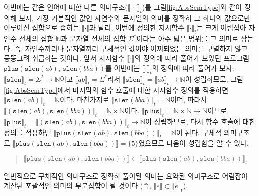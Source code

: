 이번에는 같은 언어에 때한 다른 의미구조($\llbracket\,\cdot\,\rrbracket_t$)를
그림\;\ref{fig:AbsSemType}와 같이 정의해 보자. 가장 기본적인 값인 자연수와
문자열의 의미를 정확히 그 하나의 값으로만 이루어진 집합으로 좁히는
$\llbracket\cdot\rrbracket$과 달리, 이번에 정의한 지시함수
$\llbracket\cdot\rrbracket_t$는 크게 어림잡아 자연수 전체의 집합 $\mathbb{N}$과
문자열 전체의 집합 $\Sigma^{*}$이라는 아주 넓은 범위를 그 의미로 삼는다.
즉, 자연수끼리나 문자열끼리 구체적인 값이야 어찌되었든 의미를 구별하지 않고
뭉뚱그려 취급하는 것이다. 앞서 지시함수 $\llbracket\cdot\rrbracket$의 정의에 따라
풀어가 보았던 프로그램 $\texttt{plus}(\texttt{slen}(ab),\,\texttt{slen}(bba))$를
이번에는 $\llbracket\cdot\rrbracket_t$의 정의에 따라 풀어가 보자.
$\llbracket\texttt{slen}\rrbracket_t = \Sigma^{*}\to\mathbb{N}$이고
$\llbracket ab\rrbracket_t = \Sigma^{*}$라서
$\llbracket\texttt{slen}\rrbracket_t = \llbracket ab\rrbracket_t \to \mathbb{N}$이
성립하므로, 그림\;\ref{fig:AbsSemType}에서 마지막의 함수 호출에 대한 지시함수
정의를 적용하면 $\llbracket\texttt{slen}(ab)\rrbracket_t = \mathbb{N}$이다.
마찬가지로 $\llbracket\texttt{slen}(bba)\rrbracket_t = \mathbb{N}$이며,
따라서 $\llbracket(\texttt{slen}(ab),\texttt{slen}(bba))\rrbracket_t
                      = \mathbb{N} \times \mathbb{N}$이다.
$\llbracket\texttt{plus}\rrbracket_t = \mathbb{N}\times\mathbb{N}\to\mathbb{N}$이므로
$\llbracket\texttt{plus}\rrbracket_t
 = \llbracket(\texttt{slen}(ab),\texttt{slen}(bba))\rrbracket_t\to\mathbb{N}$이
성립하므로, 다시 함수 호출에 대한 정의를 적용하면
$\llbracket\texttt{plus}(\texttt{slen}(ab),\texttt{slen}(bba))\rrbracket_t 
 = \mathbb{N}$이 된다. 구체적 의미구조로
 $\llbracket\texttt{plus}(\texttt{slen}(ab),\texttt{slen}(bba))\rrbracket
 = \{5\}$였으므로 다음이 성립함을 알 수 있다.\vspace*{-1ex}
\begin{quote}
$\llbracket\texttt{plus}(\texttt{slen}(ab),\texttt{slen}(bba))\rrbracket \subset
 \llbracket\texttt{plus}(\texttt{slen}(ab),\texttt{slen}(bba))\rrbracket_t$
\vspace*{-1ex}
\end{quote} 
일반적으로 구체적인 의미구조로 정확히 풀이된 의미는 요약된 의미구조로
어림잡아 계산된 포괄적인 의미의 부분집합이 될 것이다
(즉, $\llbracket e\rrbracket \subset \llbracket e\rrbracket_t$).

